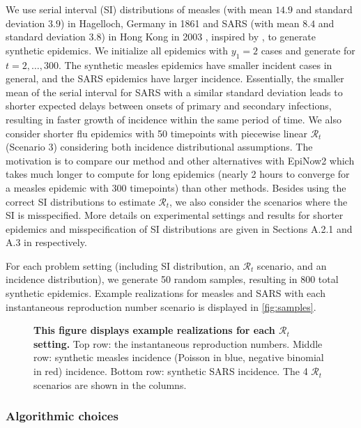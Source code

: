 \documentclass[10pt,letterpaper]{article}
\def\calR{\mathcal{R}}
\begin{document}
We use serial interval (SI) distributions of measles (with mean $14.9$ and
standard deviation $3.9$) in Hagelloch, Germany in 1861
\cite{groendyke2011bayesian} and SARS (with mean $8.4$ and standard deviation
$3.8$) in Hong Kong in 2003 \cite{lipsitch2003transmission}, inspired by
\cite{cori2013new}, to generate synthetic epidemics. We initialize all epidemics
with $y_1=2$ cases and generate for $t=2,\ldots,300$. The synthetic measles
epidemics have smaller incident cases in general, and the SARS epidemics have
larger incidence. Essentially, the smaller mean of the serial interval for SARS
with a similar standard deviation leads to shorter expected delays between
onsets of primary and secondary infections, resulting in faster growth of
incidence within the same period of time. We also consider shorter flu epidemics
with 50 timepoints with piecewise linear $\calR_t$ (Scenario 3) considering both
incidence distributional assumptions. The motivation is to compare our method
and other alternatives with EpiNow2 which takes much longer to compute for long
epidemics (nearly 2 hours to converge for a measles epidemic with 300
timepoints) than other methods. Besides using the correct SI distributions to
estimate $\calR_t$, we also consider the scenarios where the SI is misspecified.
More details on experimental settings and results for shorter epidemics and
misspecification of SI distributions are given in Sections A.2.1 and A.3 in  respectively. 

For each problem setting (including SI distribution, an $\calR_t$ scenario, and
an incidence distribution), we generate 50 random samples, resulting in $800$
total synthetic epidemics. Example realizations for measles and SARS with each
instantaneous reproduction number scenario is displayed in
\autoref{fig:samples}. 

\begin{figure}[!t]
  \centering
  \caption{{\bf This figure displays example realizations for each $\calR_t$ setting.}
  Top row: the instantaneous reproduction numbers. Middle row: synthetic measles
  incidence (Poisson in blue, negative binomial in red) incidence. Bottom row:
  synthetic SARS incidence. The 4 $\calR_t$ scenarios are shown in the
  columns.} 
  \label{fig:samples}
\end{figure}

\subsubsection{Algorithmic choices}
\end{document}
